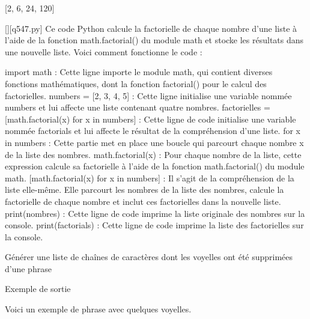 [2, 6, 24, 120]
        \par
        \begin{solution}
            \renewcommand{\nomfichier}{q547.py}
            \pythonfile{\chemincode \nomfichier}[][\nomfichier]
            Ce code Python calcule la factorielle de chaque nombre d'une liste à l'aide de la fonction math.factorial() du module math et stocke les résultats dans une nouvelle liste. Voici comment fonctionne le code :

    import math : Cette ligne importe le module math, qui contient diverses fonctions mathématiques, dont la fonction factorial() pour le calcul des factorielles.
    numbers = [2, 3, 4, 5] : Cette ligne initialise une variable nommée numbers et lui affecte une liste contenant quatre nombres.
    factorielles = [math.factorial(x) for x in numbers] : Cette ligne de code initialise une variable nommée factorials et lui affecte le résultat de la compréhension d'une liste.
        for x in numbers : Cette partie met en place une boucle qui parcourt chaque nombre x de la liste des nombres.
        math.factorial(x) : Pour chaque nombre de la liste, cette expression calcule sa factorielle à l'aide de la fonction math.factorial() du module math.
        [math.factorial(x) for x in numbers] : Il s'agit de la compréhension de la liste elle-même. Elle parcourt les nombres de la liste des nombres, calcule la factorielle de chaque nombre et inclut ces factorielles dans la nouvelle liste.
    print(nombres) : Cette ligne de code imprime la liste originale des nombres sur la console.
    print(factorials) : Cette ligne de code imprime la liste des factorielles sur la console.
        \end{solution}
        

        \question
        Générer une liste de chaînes de caractères dont les voyelles ont été supprimées d'une phrase

Exemple de sortie

Voici un exemple de phrase avec quelques voyelles.

